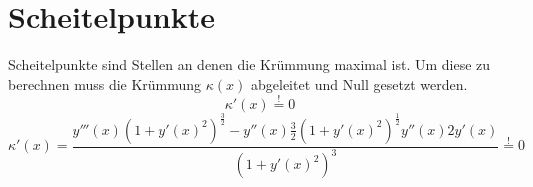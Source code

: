 \section{Scheitelpunkte}
Scheitelpunkte sind Stellen an denen die Krümmung maximal ist. 
Um diese zu berechnen muss die Krümmung $\kappa (x)$ abgeleitet und Null gesetzt werden.
\[ \kappa '(x) \stackrel{!}{=} 0  \]
\[ \boxed{\kappa '(x) = \dfrac{ y'''(x)(1+y'(x)^2)^{\frac{3}{2}} - y''(x) \frac{3}{2}(1+y'(x)^2)^{\frac{1}{2}} y''(x) 2y'(x) }{ (1+y'(x)^2)^3 } \stackrel{!}{=} 0 } \]
